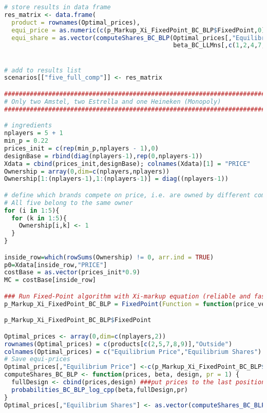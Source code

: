\begin{lstlisting}[language=R,caption={Computing dynamic Nash equilibria in different competitive scenarios via the fixed point algorithm}, label=lst_nash_esti]
# store results in data frame
res_matrix <- data.frame(
  product = rownames(Optimal_prices),
  equi_price = as.numeric(c(p_Markup_Xi_FixedPoint_BC_BLP$FixedPoint,0)),
  equi_share = as.vector(computeShares_BC_BLP(Optimal_prices[,"Equilibrium Price"],
                                              beta_BC_LLMns[,c(1,2,4,7,9,10,11)],designBase,pr=1)))


# add to results list
scenarios[["five_full_comp"]] <- res_matrix

###########################################################################
# Only two Amstel, two Estrella and one Heineken (Monopoly)
###########################################################################

# ingredients
nplayers = 5 + 1 
min_p = 0.22
prices_init = c(rep(min_p,nplayers - 1),0)
designBase = rbind(diag(nplayers-1),rep(0,nplayers-1))
Xdata = cbind(prices_init,designBase); colnames(Xdata)[1] = "PRICE" 
Ownership = array(0,dim=c(nplayers,nplayers))
Ownership[1:(nplayers-1),1:(nplayers-1)] = diag((nplayers-1))

# define which brands compete on price, i.e. are owned by different companies
# All five belong to the same owner
for (i in 1:5){
  for (k in 1:5){
    Ownership[i,k] <- 1
  }
}

inside_row=which(rowSums(Ownership) != 0, arr.ind = TRUE)
p0=Xdata[inside_row,"PRICE"]
costBase = as.vector(prices_init*0.9)
MC = costBase[inside_row]

### Run Fixed-Point algorithm with Xi-markup equation (reliable and fast: See Table 3 in paper for comparison)
p_Markup_Xi_FixedPoint_BC_BLP = FixedPoint(Function = function(price_vec) FixedPoint_BLP_Xi(price_vec,MC=MC, ownership=Ownership,Xdata=Xdata,beta_draws=beta_BC_LLMns[,(c(1,2,4,7,9,10,11))],pr=1),  Inputs = p0, MaxIter = 10000, ConvergenceMetricThreshold = 1e-10, Method = "Anderson")

p_Markup_Xi_FixedPoint_BC_BLP$FixedPoint

Optimal_prices <- array(0,dim=c(nplayers,2))
rownames(Optimal_prices) = c(products[c(2,5,7,8,9)],"Outside")
colnames(Optimal_prices) = c("Equilibrium Price","Equilibrium Shares")
# Save equi-prices
Optimal_prices[,"Equilibrium Price"] <-c(p_Markup_Xi_FixedPoint_BC_BLP$FixedPoint,0)
computeShares_BC_BLP <- function(prices, beta, design, pr = 1) {
  fullDesign <- cbind(prices,design) ###put prices to the last position here
  probabilities_BC_BLP_log_cpp(beta,fullDesign,pr)
}
Optimal_prices[,"Equilibrium Shares"] <- as.vector(computeShares_BC_BLP(Optimal_prices[,"Equilibrium Price"], beta_BC_LLMns[,c(1,2,4,7,9,10,11)],designBase,pr=1))


\end{lstlisting}
